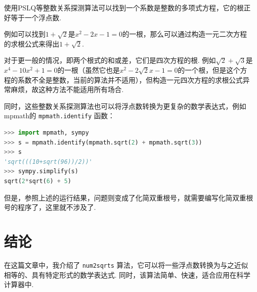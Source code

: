 \documentclass[a4paper, UTF8]{ctexart}
\begin{document}
使用PSLQ\cite{ferguson1991}等整数关系探测算法可以找到一个系数是整数的多项式方程，它的根正好等于一个浮点数.

例如可以找到$1+\sqrt{2}$是$x^2-2x-1=0$的一根，那么可以通过构造一元二次方程的求根公式来得出$1+\sqrt{2}$.

对于更一般的情况，即两个根式的和或差，它们是四次方程的根. 例如$\sqrt{2}+\sqrt{3}$是$x^4-10x^2+1=0$的一根（虽然它也是$x^2-2\sqrt{2}x-1=0$的一个根，但是这个方程的系数不全是整数，当前的算法并不适用），但构造一元四次方程的求根公式异常麻烦，故这种方法不能适用所有场合.

同时，这些整数关系探测算法也可以将浮点数转换为更复杂的数学表达式，例如mpmath\cite{mpmath}的 \verb|mpmath.identify| 函数：
\begin{lstlisting}[language=python, numbers=none]
>>> import mpmath, sympy
>>> s = mpmath.identify(mpmath.sqrt(2) + mpmath.sqrt(3))
>>> s
'sqrt(((10+sqrt(96))/2))'
>>> sympy.simplify(s)
sqrt(2*sqrt(6) + 5)
\end{lstlisting}
但是，参照上述的运行结果，问题则变成了化简双重根号，就需要编写化简双重根号的程序了，这里就不涉及了.

\section{结论}
在这篇文章中，我介绍了 \verb|num2sqrts| 算法，它可以将一些浮点数转换为与之近似相等的、具有特定形式的数学表达式. 同时，该算法简单、快速，适合应用在科学计算器中.

\printbibliography[title={参考文献}]
\end{document}
